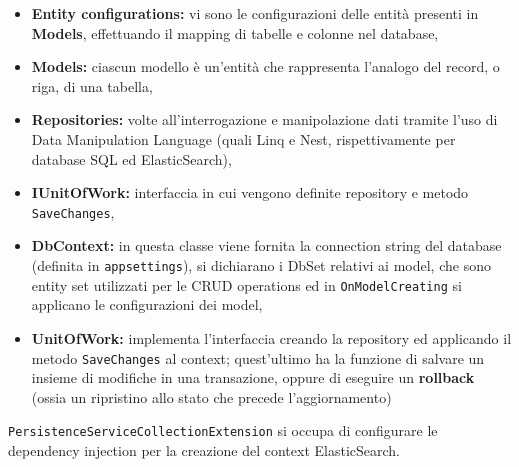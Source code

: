 \begin{itemize}
\item 
\textbf{Entity configurations:} vi sono le configurazioni delle entità presenti in \textbf{Models}, effettuando il mapping di tabelle e colonne nel database,
\item
\textbf{Models:} ciascun modello è un'entità che rappresenta l'analogo del record, o riga, di una tabella,
\item 
\textbf{Repositories:} volte all'interrogazione e manipolazione dati tramite l'uso di Data Manipulation Language (quali Linq e Nest, rispettivamente per database SQL ed ElasticSearch),
\item 
\textbf{IUnitOfWork:} interfaccia in cui vengono definite repository e metodo \verb|SaveChanges|,
\item
\textbf{DbContext:} in questa classe viene fornita la connection string del database (definita in \verb|appsettings|), si dichiarano i DbSet relativi ai model, che sono entity set utilizzati per le CRUD operations \cite{DbSet} ed in \verb|OnModelCreating| si applicano le configurazioni dei model,
\item 
\textbf{UnitOfWork:} implementa l'interfaccia creando la repository ed applicando il metodo \verb|SaveChanges| al context; quest'ultimo ha la funzione di salvare un insieme di modifiche in una transazione, oppure di eseguire un \textbf{rollback} (ossia un ripristino allo stato che precede l'aggiornamento)
\end{itemize}
\verb|PersistenceServiceCollectionExtension| si occupa di configurare le dependency injection per la creazione del context ElasticSearch.